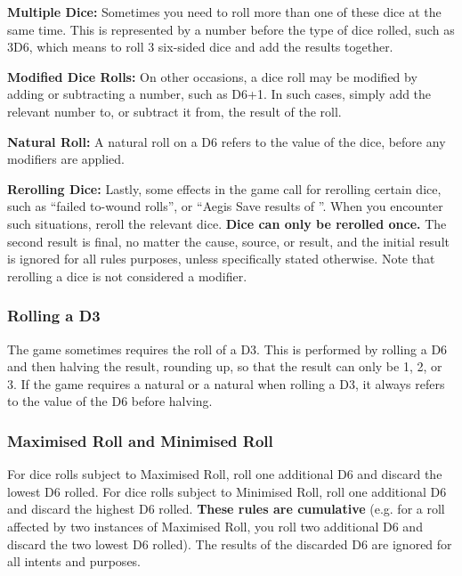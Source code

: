 \textbf{Multiple Dice:} Sometimes you need to roll more than one of these dice at the same time. This is represented by a number before the type of dice rolled, such as 3D6, which means to roll 3 six-sided dice and add the results together.

\textbf{Modified Dice Rolls:} On other occasions, a dice roll may be modified by adding or subtracting a number, such as D6+1. In such cases, simply add the relevant number to, or subtract it from, the result of the roll.

\textbf{Natural Roll:} A natural roll on a D6 refers to the value of the dice, before any modifiers are applied.

\textbf{Rerolling Dice:} Lastly, some effects in the game call for rerolling certain dice, such as \enquote{failed to-wound rolls}, or \enquote{Aegis Save results of }. When you encounter such situations, reroll the relevant dice. \textbf{Dice can only be rerolled once.} The second result is final, no matter the cause, source, or result, and the initial result is ignored for all rules purposes, unless specifically stated otherwise. Note that rerolling a dice is not considered a modifier.

\subsubsection{Rolling a D3}

The game sometimes requires the roll of a D3. This is performed by rolling a D6 and then halving the result, rounding up, so that the result can only be 1, 2, or 3. If the game requires a natural  or a natural  when rolling a D3, it always refers to the value of the D6 before halving.

\subsubsection{Maximised Roll and Minimised Roll}
\label{maximised_roll}

For dice rolls subject to Maximised Roll, roll one additional D6 and discard the lowest D6 rolled. For dice rolls subject to Minimised Roll, roll one additional D6 and discard the highest D6 rolled. \textbf{These rules are cumulative} (e.g. for a roll affected by two instances of Maximised Roll, you roll two additional D6 and discard the two lowest D6 rolled). The results of the discarded D6 are ignored for all intents and purposes.

